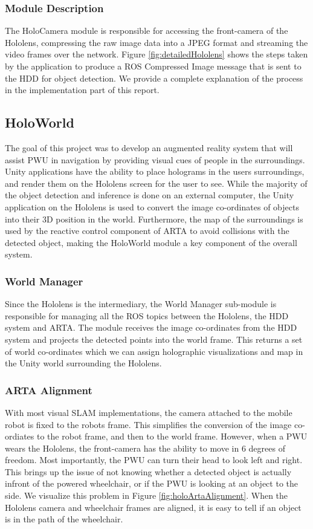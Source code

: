 \subsubsection{Module Description}
The HoloCamera module is responsible for accessing the front-camera of the Hololens, compressing the raw image data into a JPEG format and streaming the video frames over the network. Figure \ref{fig:detailedHololens} shows the steps taken by the application to produce a ROS Compressed Image message that is sent to the HDD for object detection. We provide a complete explanation of the process in the implementation part of this report.

\subsection{HoloWorld}
The goal of this project was to develop an augmented reality system that will assist PWU in navigation by providing visual cues of people in the surroundings. Unity applications have the ability to place holograms in the users surroundings, and render them on the Hololens screen for the user to see. While the majority of the object detection and inference is done on an external computer, the Unity application on the Hololens is used to convert the image co-ordinates of objects into their 3D position in the world. Furthermore, the map of the surroundings is used by the reactive control component of ARTA to avoid collisions with the detected object, making the HoloWorld module a key component of the overall system.

\subsubsection{World Manager}
Since the Hololens is the intermediary, the World Manager sub-module is responsible for managing all the ROS topics between the Hololens, the HDD system and ARTA. The module receives the image co-ordinates from the HDD system and projects the detected points into the world frame. This returns a set of world co-ordinates which we can assign holographic visualizations and map in the Unity world surrounding the Hololens.

\subsubsection{ARTA Alignment} 
With most visual SLAM implementations, the camera attached to the mobile robot is fixed to the robots frame. This simplifies the conversion of the image co-ordiates to the robot frame, and then to the world frame. However, when a PWU wears the Hololens, the front-camera has the ability to move in 6 degrees of freedom. Most importantly, the PWU can turn their head to look left and right. This brings up the issue of not knowing whether a detected object is actually infront of the powered wheelchair, or if the PWU is looking at an object to the side. We visualize this problem in Figure \ref{fig:holoArtaAlignment}. When the Hololens camera and wheelchair frames are aligned, it is easy to tell if an object is in the path of the wheelchair.


